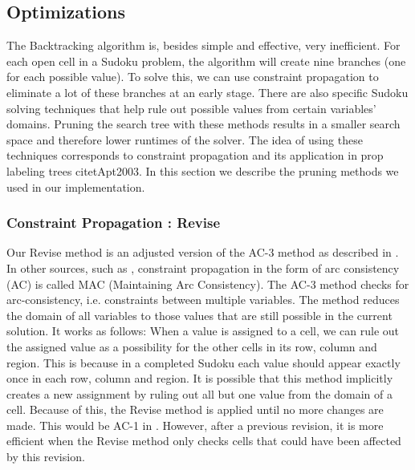 \documentclass[11pt]{article} %
\begin{document}
\subsection{Optimizations}
\label{sec:optim}

The Backtracking algorithm is, besides simple and effective, very inefficient. For each open cell in a Sudoku problem, the algorithm will create nine branches (one for each possible value). To solve this, we can use constraint propagation to eliminate a lot of these branches at an early stage. There are also specific Sudoku solving techniques that help rule out possible values from certain variables' domains. Pruning the search tree with these methods results in a smaller search space and therefore lower runtimes of the solver. The idea of using these techniques corresponds to constraint propagation and its application in prop labeling trees citet{Apt2003}. In this section we describe the pruning methods we used in our implementation.

\subsubsection{Constraint Propagation : Revise}
\label{sec:revise}

Our Revise method is an adjusted version of the AC-3 method as described in \citet{BartakConsistency}.
In other sources, such as \citet{Apt2003}, constraint propagation in the form of arc consistency (AC) is called MAC (Maintaining Arc Consistency).
The AC-3 method checks for arc-consistency, i.e. constraints between multiple variables. The method reduces the domain of all variables to those values that are still possible in the current solution.
It works as follows: When a value is assigned to a cell, we can rule out the assigned value as a possibility for the other cells in its row, column and region. This is because in a completed Sudoku each value should appear exactly once in each row, column and region. It is possible that this method implicitly creates a new assignment by ruling out all but one value from the domain of a cell. Because of this, the Revise method is applied until no more changes are made. This would be AC-1 in \cite{BartakConsistency}. However, after a previous revision, it is more efficient when the Revise method only checks cells that could have been affected by this revision.
\end{document}
